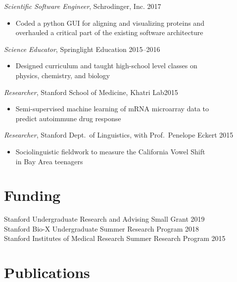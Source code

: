 \documentclass[margin]{res}
\newenvironment{myitemize}
{ \vspace{-1.5\topsep} \begin{itemize} }
{ \end{itemize} \vspace{-1.0\topsep}}
\begin{document}
\begin{resume}
\textit{Scientific Software Engineer}, Schrodinger, Inc. \hfill 2017 \\
\begin{myitemize}
    \item Coded a python GUI for aligning and visualizing proteins and \\overhauled a critical part of the existing software architecture
\end{myitemize}

\textit{Science Educator}, Springlight Education \hfill 2015--2016\\
\begin{myitemize}
    \item Designed curriculum and taught high-school level classes on \\
        physics, chemistry, and biology
\end{myitemize}

\textit{Researcher}, Stanford School of Medicine, Khatri Lab\hfill 2015\\
\begin{myitemize}
    \item Semi-supervised machine learning of mRNA microarray data to \\predict autoimmune drug response
\end{myitemize}

\textit{Researcher}, Stanford Dept.\ of Linguistics, with Prof.\ Penelope Eckert \hfill 2015\\
\begin{myitemize}
    \item Sociolinguistic fieldwork to measure the California Vowel Shift \\in Bay Area teenagers
\end{myitemize}

\section{Funding}

Stanford Undergraduate Research and Advising Small Grant \hfill 2019 \\
Stanford Bio-X Undergraduate Summer Research Program \hfill 2018 \\
Stanford Institutes of Medical Research Summer Research Program \hfill 2015

\section{Publications}


\end{resume}
\end{document}
